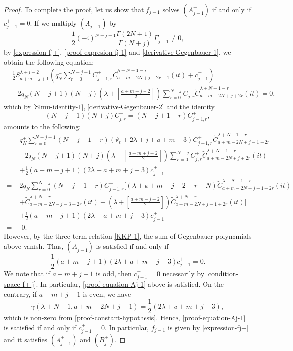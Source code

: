 \documentclass[12pt, pdflatex, a4paper]{article}
\theoremstyle{plain}
\theoremstyle{definition}
\def\Geg{\widetilde{C}}
\begin{document}
\begin{proof}
To complete the proof, let us show that $f_{j-1}$ solves $(A_{j-1}^+)$ if and only if $c_{j-1}^+ = 0$. If we multiply $(A_{j-1}^+)$ by
\begin{equation*}
\frac{1}{2}(-i)^{N-j+1}\frac{\Gamma(2N+1)}{\Gamma(N+j)}\Gamma_{j-1}^+ \neq 0,
\end{equation*}
by \eqref{expression-fj+}, \eqref{proof-expresion-fj-1} and \eqref{derivative-Gegenbauer-1}, we obtain the following equation:
\begin{align*}
&\frac{1}{2}S_{a+m-j+1}^{\lambda+j-2}\left(q_N^+\sum_{r=0}^{N-j+1}C_{j-1, r}^+\Geg_{a+m-2N+j+2r-1}^{\lambda+N-1-r}(it) + c_{j-1}^+\right)\\
&-2q_N^+(N-j+1)(N+j)\left(\lambda + \left[\frac{a+m+j-2}{2}\right]\right)\sum_{r=0}^{N-j}C_{j, r}^+\Geg_{a+m-2N+j+2r}^{\lambda+N-1-r}(it) = 0,
\end{align*}
which by \eqref{Slmu-identity-1}, \eqref{derivative-Gegenbauer-2} and the identity 
\begin{equation*}
(N-j+1)(N+j)C_{j, r}^+ = (N-j+1-r)C_{j-1, r}^+,
\end{equation*}
amounts to the following:
\begin{align*}
& q_N^+\sum_{r=0}^{N-j+1}(N-j+1-r)(\vartheta_t + 2\lambda + j + a + m-3)C_{j-1, r}^+\Geg_{a+m-2N+j-1+2r}^{\lambda+N-1-r}\\
&-2q_N^+(N-j+1)(N+j)\left(\lambda + \left[\frac{a+m+j-2}{2}\right]\right)\sum_{r=0}^{N-j}C_{j, r}^+\Geg_{a+m-2N+j+2r}^{\lambda+N-1-r}(it)\\
&+ \frac{1}{2}(a+m-j+1)(2\lambda+a+m+j-3)c_{j-1}^+\\
= \;& 2q_N^+\sum_{r=0}^{N-j}(N-j+1-r)C_{j-1, r}^+\Bigg[(\lambda+a+m+j-2+r-N)\Geg_{a+m-2N+j-1+2r}^{\lambda+N-1-r}(it)\\
& + \Geg_{a+m-2N+j-3+2r}^{\lambda+N-r}(it) - \left(\lambda + \left[\frac{a+m+j-2}{2}\right]\right)\Geg_{a+m-2N+j-1+2r}^{\lambda+N-r}(it)\Bigg]\\
&+ \frac{1}{2}(a+m-j+1)(2\lambda+a+m+j-3)c_{j-1}^+\\
=&\; 0.
\end{align*}
However, by the three-term relation \eqref{KKP-1}, the sum of Gegenbauer polynomials above vanish. Thus, $(A_{j-1}^+)$ is satisfied if and only if
\begin{equation}\label{proof-equation-Aj-1}
\frac{1}{2}(a+m-j+1)(2\lambda+a+m+j-3)c_{j-1}^+ = 0.
\end{equation}
We note that if $a+m+j-1$ is odd, then $c_{j-1}^+ = 0$ necessarily by \eqref{condition-space-f+-j}. In particular, \eqref{proof-equation-Aj-1} above is satisfied. On the contrary, if $a+m+j-1$ is even, we have
\begin{equation*}
\gamma(\lambda+N-1, a+m-2N+j-1) = \frac{1}{2}(2\lambda+a+m+j-3),
\end{equation*}
which is non-zero from \eqref{proof-constant-hypothesis}. Hence, \eqref{proof-equation-Aj-1} is satisfied if and only if $c_{j-1}^+ = 0$. In particular, $f_{j-1}$ is given by \eqref{expression-fj+} and it satisfies $(A_{j-1}^+)$ and $(B_j^+)$.
\end{proof}
\end{document}
